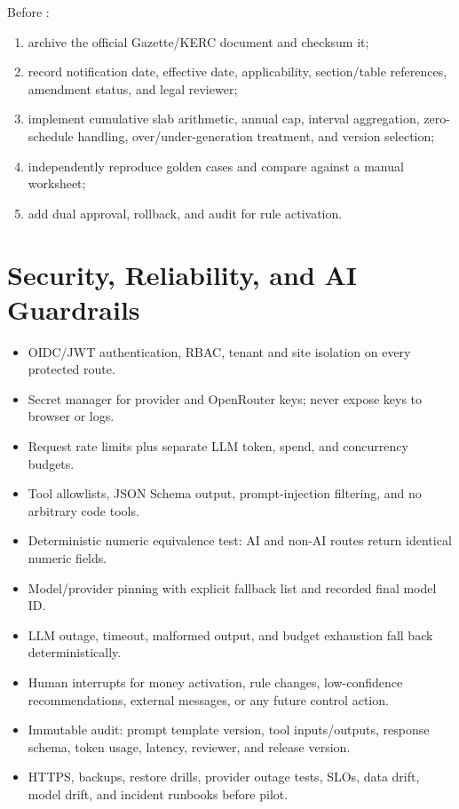 Before :

\begin{enumerate}
  \item archive the official Gazette/KERC document and checksum it;
  \item record notification date, effective date, applicability, section/table references,
        amendment status, and legal reviewer;
  \item implement cumulative slab arithmetic, annual cap, interval aggregation, zero-schedule
        handling, over/under-generation treatment, and version selection;
  \item independently reproduce golden cases and compare against a manual worksheet;
  \item add dual approval, rollback, and audit for rule activation.
\end{enumerate}

\section{Security, Reliability, and AI Guardrails}

\begin{itemize}
  \item OIDC/JWT authentication, RBAC, tenant and site isolation on every protected route.
  \item Secret manager for provider and OpenRouter keys; never expose keys to browser or logs.
  \item Request rate limits plus separate LLM token, spend, and concurrency budgets.
  \item Tool allowlists, JSON Schema output, prompt-injection filtering, and no arbitrary code tools.
  \item Deterministic numeric equivalence test: AI and non-AI routes return identical numeric fields.
  \item Model/provider pinning with explicit fallback list and recorded final model ID.
  \item LLM outage, timeout, malformed output, and budget exhaustion fall back deterministically.
  \item Human interrupts for money activation, rule changes, low-confidence recommendations,
        external messages, or any future control action.
  \item Immutable audit: prompt template version, tool inputs/outputs, response schema, token usage,
        latency, reviewer, and release version.
  \item HTTPS, backups, restore drills, provider outage tests, SLOs, data drift, model drift,
        and incident runbooks before pilot.
\end{itemize}

